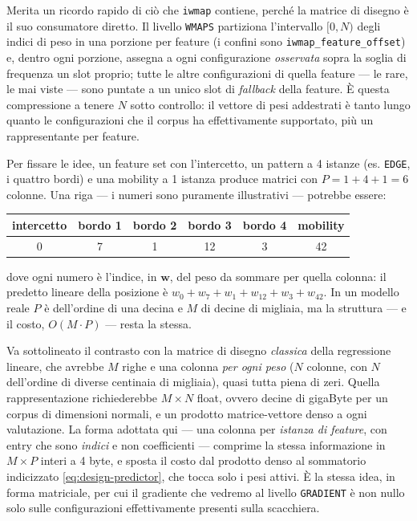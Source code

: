 Merita un ricordo rapido di ciò che \texttt{iwmap} contiene, perché la
matrice di disegno è il suo consumatore diretto. Il livello \texttt{WMAPS}
partiziona l'intervallo $[0, N)$ degli indici di peso in una porzione per
feature (i confini sono \texttt{iwmap\_feature\_offset}) e, dentro ogni
porzione, assegna a ogni configurazione \emph{osservata} sopra la soglia di
frequenza un slot proprio; tutte le altre configurazioni di quella feature —
le rare, le mai viste — sono puntate a un unico slot di \emph{fallback}
della feature. È questa compressione a tenere $N$ sotto controllo: il
vettore di pesi addestrati è tanto lungo quanto le configurazioni che il
corpus ha effettivamente supportato, più un rappresentante per feature.

Per fissare le idee, un feature set con l'intercetto, un pattern a 4 istanze
(es. \texttt{EDGE}, i quattro bordi) e una mobility a 1 istanza produce
matrici con $P = 1 + 4 + 1 = 6$ colonne. Una riga — i numeri sono puramente
illustrativi — potrebbe essere:

\begin{center}
\small
\begin{tabular}{cccccc}
\toprule
intercetto & bordo 1 & bordo 2 & bordo 3 & bordo 4 & mobility \\
\midrule
0          & 7         & 1         & 12        & 3         & 42        \\
\bottomrule
\end{tabular}
\end{center}

dove ogni numero è l'indice, in $\bm{w}$, del peso da sommare per quella
colonna: il predetto lineare della posizione è
$w_0 + w_7 + w_1 + w_{12} + w_3 + w_{42}$. In un modello reale $P$ è
dell'ordine di una decina e $M$ di decine di migliaia, ma la struttura — e il
costo, $O(M \cdot P)$ — resta la stessa.

Va sottolineato il contrasto con la matrice di disegno \emph{classica} della
regressione lineare, che avrebbe $M$ righe e una colonna \emph{per ogni peso}
($N$ colonne, con $N$ dell'ordine di diverse centinaia di migliaia),
quasi tutta piena di zeri. Quella rappresentazione richiederebbe
$M \times N$ float, ovvero decine di gigaByte per un corpus di dimensioni
normali, e un prodotto matrice-vettore denso a ogni valutazione. La forma
adottata qui — una colonna per \emph{istanza di feature}, con entry che sono
\emph{indici} e non coefficienti — comprime la stessa informazione in
$M \times P$ interi a 4 byte, e sposta il costo dal prodotto denso al
sommatorio indicizzato \eqref{eq:design-predictor}, che tocca solo i pesi
attivi. È la stessa idea, in forma matriciale, per cui il gradiente che
vedremo al livello \texttt{GRADIENT} è non nullo solo sulle configurazioni
effettivamente presenti sulla scacchiera.


